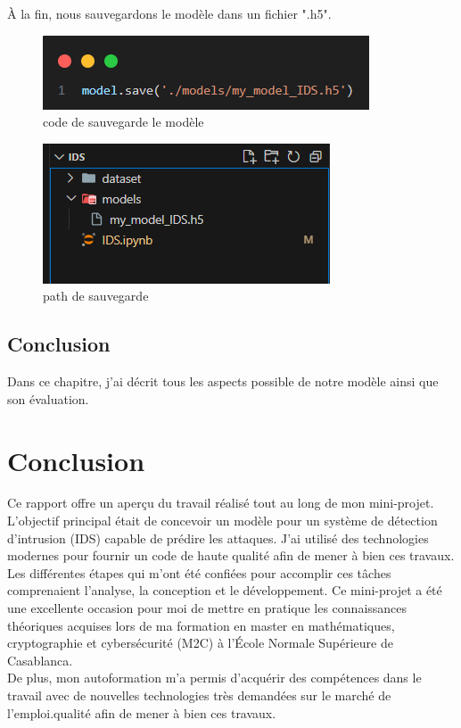 \documentclass[a4paper,12pt]{report}
\begin{document}
À la fin, nous sauvegardons le modèle dans un fichier ".h5".
\begin{figure}[H]
\centering
 \includegraphics[scale=0.99]{outils-images/data26.png}
\caption{code de sauvegarde le modèle}
\end{figure}

\begin{figure}[H]
\centering
 \includegraphics[scale=0.99]{outils-images/data27.png}
\caption{path de sauvegarde}
\end{figure}

\section {Conclusion}
\noindent\normalsize Dans ce chapitre, j'ai décrit tous les aspects possible de notre modèle ainsi que son évaluation.

\chapter*{\centering Conclusion}
\noindent\normalsize Ce rapport offre un aperçu du travail réalisé tout au long de mon mini-projet. L'objectif principal était de concevoir un modèle pour un système de détection d'intrusion (IDS) capable de prédire les attaques. J'ai utilisé des technologies modernes pour fournir un code de haute qualité afin de mener à bien ces travaux.\\[0.5cm]
Les différentes étapes qui m'ont été confiées pour accomplir ces tâches comprenaient l'analyse, la conception et le développement. Ce mini-projet a été une excellente occasion pour moi de mettre en pratique les connaissances théoriques acquises lors de ma formation en master en mathématiques, cryptographie et cybersécurité (M2C) à l'École Normale Supérieure de Casablanca.\\[0.5cm]
De plus, mon autoformation m'a permis d'acquérir des compétences dans le travail avec de nouvelles technologies très demandées sur le marché de l'emploi.qualité afin de mener à bien ces travaux.




\end{document}
